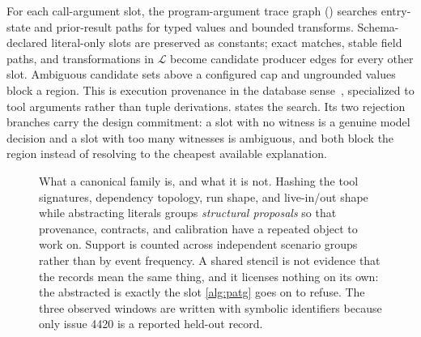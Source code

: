For each call-argument slot, the program-argument trace graph (\patg) searches entry-state
and prior-result paths for typed values and bounded transforms. Schema-declared literal-only
slots are preserved as constants; exact matches, stable field paths, and transformations in
$\mathcal{L}$ become candidate producer edges for every other slot.
Ambiguous candidate sets above a configured cap and ungrounded values block a region.
This is execution provenance in the database sense~\cite{cheney2009provenance}, specialized
to tool arguments rather than tuple derivations.   states the search.  Its
two rejection branches carry the design commitment: a slot with no witness is a genuine
model decision and a slot with too many witnesses is ambiguous, and both block the region
instead of resolving to the cheapest available explanation.



\begin{figure}[t]
  \centering
  
  \caption{What a canonical family is, and what it is not.  Hashing the tool signatures,
  dependency topology, run shape, and live-in/out shape while abstracting literals groups
  \emph{structural proposals} so that provenance, contracts, and calibration have a
  repeated object to work on.  Support is counted across independent scenario groups
  rather than by event frequency.  A shared stencil is not evidence that the records mean
  the same thing, and it licenses nothing on its own: the abstracted  is
  exactly the slot \cref{alg:patg} goes on to refuse.  The three observed windows are
  written with symbolic identifiers because only issue 4420 is a reported held-out
  record.}
  \label{fig:canonical-family}
\end{figure}

